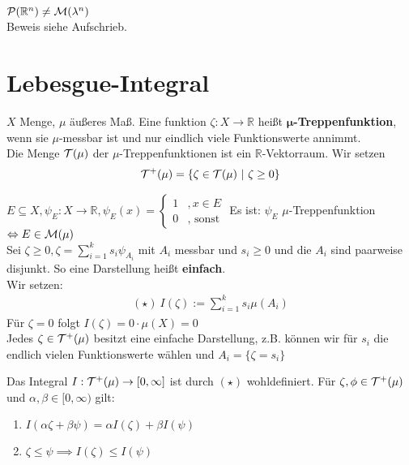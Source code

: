 \documentclass[11pt,a4paper,fleqn,openany]{report}
\begin{document}
    \begin{example}[Vitali 1905]
      $\mathcal{P}(\mathbb{R}^n) \neq \mathcal{M}(\lambda^n)$\\
      Beweis siehe Aufschrieb.
    \end{example}

  \chapter{Lebesgue-Integral}
    \begin{definition}
      $X$ Menge, $\mu$ äußeres Maß. Eine funktion $\zeta: X \to \mathbb{R}$ heißt $\bm{\mu}$\textbf{-Treppenfunktion}, wenn sie $\mu$-messbar ist und nur eindlich viele Funktionswerte annimmt.\\
      Die Menge $\mathcal{T}(\mu)$ der $\mu$-Treppenfunktionen ist ein $\mathbb{R}$-Vektorraum. Wir setzen
      \begin{align*}
        \mathcal{T}^+(\mu)=\{\zeta \in \mathcal{T}(\mu) \ | \ \zeta \geq 0\}
      \end{align*}
    \end{definition}

    \begin{example}
      $E \subseteq X, \psi_E: X \to \mathbb{R}, \psi_E(x) = \begin{cases}
        1 & ,x \in E\\
        0 & ,\text{ sonst}
      \end{cases}$  Es ist: $\psi_E$ $\mu$-Treppenfunktion $\Leftrightarrow E \in \mathcal{M}(\mu)$\\
      Sei $\zeta \geq 0, \zeta = \sum\limits_{i=1}^k s_i \psi_{A_i}$ mit $A_i$ messbar und $s_i \geq 0$ und die $A_i$ sind paarweise disjunkt. So eine Darstellung heißt \textbf{einfach}.\\
      Wir setzen:
      \begin{align*}
        (\star) \ I(\zeta) := \sum\limits_{i=1}^k s_i \mu(A_i)
      \end{align*} 
      Für $\zeta=0$ folgt $I(\zeta) = 0 \cdot \mu(X) = 0$\\
      Jedes $\zeta \in \mathcal{T}^+(\mu)$ besitzt eine einfache Darstellung, z.B. können wir für $s_i$ die endlich vielen Funktionswerte wählen und $A_i = \{\zeta = s_i\}$
    \end{example}

    \begin{lemma}
      Das Integral $I: \mathcal{T}^+(\mu) \to [0,\infty]$ ist durch $(\star)$ wohldefiniert. Für $\zeta, \phi \in \mathcal{T}^+(\mu)$ und $\alpha, \beta \in [0, \infty)$ gilt:
      \begin{enumerate}[label=\roman*)]
        \item $I(\alpha \zeta + \beta \psi) = \alpha I(\zeta) + \beta I(\psi)$
        \item $\zeta \leq \psi \implies I(\zeta) \leq I(\psi)$ 
      \end{enumerate}
    \end{lemma}
\end{document}
